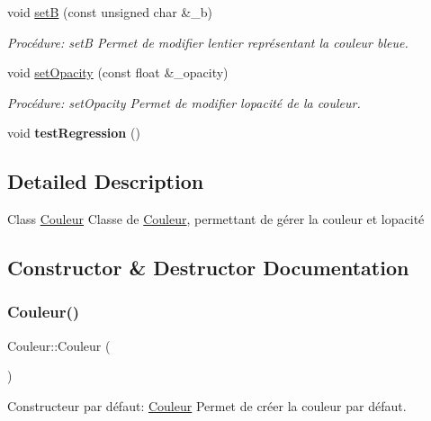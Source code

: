 \begin{DoxyCompactItemize}
void \hyperlink{classCouleur_ac598f1ad284ae2b59c5d781306ae9b0f}{setB} (const unsigned char \&\+\_\+b)
\begin{DoxyCompactList}\small\item\em Procédure\+: setB Permet de modifier l\textquotesingle{}entier représentant la couleur bleue. \end{DoxyCompactList}\item 
void \hyperlink{classCouleur_a54817aff2a5f8d5dfcf6358d523c923a}{set\+Opacity} (const float \&\+\_\+opacity)
\begin{DoxyCompactList}\small\item\em Procédure\+: set\+Opacity Permet de modifier l\textquotesingle{}opacité de la couleur. \end{DoxyCompactList}\item 
\mbox{\label{classCouleur_ad6b8c5cea7c4f2d7a71f778d3c406d07}} 
void {\bfseries test\+Regression} ()
\end{DoxyCompactItemize}


\subsection{Detailed Description}
Class \hyperlink{classCouleur}{Couleur} Classe de \hyperlink{classCouleur}{Couleur}, permettant de gérer la couleur et l\textquotesingle{}opacité 

\subsection{Constructor \& Destructor Documentation}
\mbox{\label{classCouleur_a687a457edb08b51dbcd0299bb0b6a882}} 
\subsubsection{\texorpdfstring{Couleur()}{Couleur()}\hspace{0.1cm}{\footnotesize\ttfamily [1/3]}}
{\footnotesize\ttfamily Couleur\+::\+Couleur (\begin{DoxyParamCaption}{ }\end{DoxyParamCaption})}



Constructeur par défaut\+: \hyperlink{classCouleur}{Couleur} Permet de créer la couleur par défaut. 


